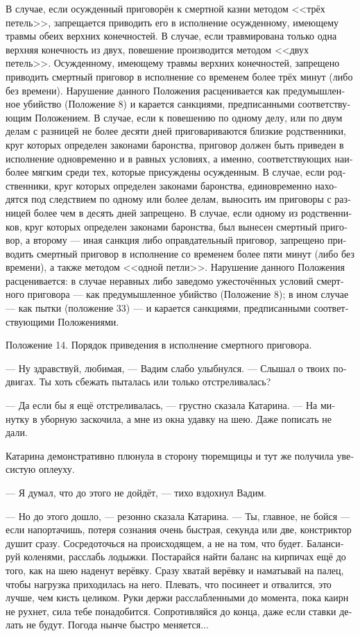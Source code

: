\documentclass[a4paper,12pt,fleqn]{book}\usepackage{cooltooltips}\usepackage{polyglossia}\setdefaultlanguage[babelshorthands=true]{russian}\setotherlanguage{english}\defaultfontfeatures{Ligatures=TeX,Mapping=tex-text} \usepackage{xcolor}\definecolor{lightgray}{HTML}{bbbbbb}\color{lightgray}\newcommand{\ml}[3]{\textenglish{\textcolor{black}{#3}}}
\begin{document}
\epigraph{
В случае, если осужденный приговорён к смертной казни методом <<трёх петель>>, запрещается приводить его в исполнение осужденному, имеющему травмы обеих верхних конечностей.
В случае, если травмирована только одна верхняя конечность из двух, повешение производится методом <<двух петель>>.
Осужденному, имеющему травмы верхних конечностей, запрещено приводить смертный приговор в исполнение со временем более трёх минут (либо без времени).
Нарушение данного Положения расценивается как предумышленное убийство (Положение 8) и карается санкциями, предписанными соответствующим Положением.
В случае, если к повешению по одному делу, или по двум делам с разницей не более десяти дней приговариваются близкие родственники, круг которых определен законами баронства, приговор должен быть приведен в исполнение одновременно и в равных условиях, а именно, соответствующих наиболее мягким среди тех, которые присуждены осужденным.
В случае, если родственники, круг которых определен законами баронства, единовременно находятся под следствием по одному или более делам, выносить им приговоры с разницей более чем в десять дней запрещено.
В случае, если одному из родственников, круг которых определен законами баронства, был вынесен смертный приговор, а второму --- иная санкция либо оправдательный приговор, запрещено приводить смертный приговор в исполнение со временем более пяти минут (либо без времени), а также методом <<одной петли>>.
Нарушение данного Положения расценивается: в случае неравных либо заведомо ужесточённых условий смертного приговора --- как предумышленное убийство (Положение 8); в ином случае --- как пытки (положение 33) --- и карается санкциями, предписанными соответствующими Положениями.
}{
Положение 14.
Порядок приведения в исполнение смертного приговора.
}

--- Ну здравствуй, любимая, --- Вадим слабо улыбнулся.
--- Слышал о твоих подвигах.
Ты хоть сбежать пыталась или только отстреливалась?

--- Да если бы я ещё отстреливалась, --- грустно сказала Катарина.
--- На минутку в уборную заскочила, а мне из окна удавку на шею.
Даже пописать не дали.

Катарина демонстративно плюнула в сторону тюремщицы и тут же получила увесистую оплеуху.

--- Я думал, что до этого не дойдёт, --- тихо вздохнул Вадим.

--- Но до этого дошло, --- резонно сказала Катарина.
--- Ты, главное, не бойся --- если напортачишь, потеря сознания очень быстрая, секунда или две, констриктор душит сразу.
Сосредоточься на происходящем, а не на том, что будет.
Балансируй коленями, расслабь лодыжки.
Постарайся найти баланс на кирпичах ещё до того, как на шею наденут верёвку.
Сразу хватай верёвку и наматывай на палец, чтобы нагрузка приходилась на него.
Плевать, что посинеет и отвалится, это лучше, чем кисть целиком.
Руки держи расслабленными до момента, пока каирн не рухнет, сила тебе понадобится.
Сопротивляйся до конца, даже если ставки делать не будут.
Погода нынче быстро меняется...
\end{document}
